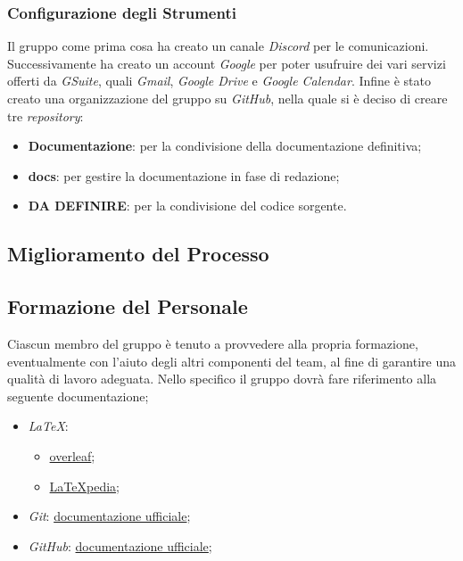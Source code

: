         \subsubsection{Configurazione degli Strumenti}
            Il gruppo come prima cosa ha creato un canale \textit{Discord} per le comunicazioni.
            Successivamente ha creato un account \textit{Google} per poter usufruire dei vari servizi offerti da \textit{GSuite}, quali \textit{Gmail}, \textit{Google Drive} e \textit{Google Calendar}.
            Infine è stato creato una organizzazione del gruppo su \textit{GitHub}, nella quale si è deciso di creare tre \textit{repository}:
                \begin{itemize}
                    \item \textbf{Documentazione}: per la condivisione della documentazione definitiva;
                    \item \textbf{docs}: per gestire la documentazione in fase di redazione;
                    \item \textbf{DA DEFINIRE}: per la condivisione del codice sorgente.
                \end{itemize}

    \subsection{Miglioramento del Processo}

    \subsection{Formazione del Personale}
        Ciascun membro del gruppo è tenuto a provvedere alla propria formazione, eventualmente con l'aiuto degli altri componenti del team, al fine di garantire una qualità di lavoro adeguata.
        Nello specifico il gruppo dovrà fare riferimento alla seguente documentazione;
                \begin{itemize}
                    \item \textit{LaTeX}:
                        \begin{itemize}
                            \item  \href{https://www.overleaf.com/learn}{overleaf};
                            \item \href{http://www.lorenzopantieri.net/LaTeX_files/LaTeXpedia.pdf}{LaTeXpedia};
                        \end{itemize}
                    \item \textit{Git}: \href{https://git-scm.com/docs}{documentazione ufficiale};
                    \item \textit{GitHub}: \href{https://support.github.com}{documentazione ufficiale};
                \end{itemize}